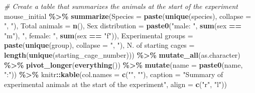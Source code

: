 \documentclass[
]{book}
\newenvironment{Shaded}{\begin{snugshade}}{\end{snugshade}}
\newcommand{\AttributeTok}[1]{\textcolor[rgb]{0.13,0.29,0.53}{#1}}
\newcommand{\CommentTok}[1]{\textcolor[rgb]{0.56,0.35,0.01}{\textit{#1}}}
\newcommand{\FunctionTok}[1]{\textcolor[rgb]{0.13,0.29,0.53}{\textbf{#1}}}
\newcommand{\NormalTok}[1]{#1}
\newcommand{\OtherTok}[1]{\textcolor[rgb]{0.56,0.35,0.01}{#1}}
\newcommand{\SpecialCharTok}[1]{\textcolor[rgb]{0.81,0.36,0.00}{\textbf{#1}}}
\newcommand{\StringTok}[1]{\textcolor[rgb]{0.31,0.60,0.02}{#1}}
\begin{document}
\begin{Shaded}
\begin{Highlighting}[]
\CommentTok{\# Create a table that summarizes the animals at the start of the experiment}
\NormalTok{mouse\_initial }\SpecialCharTok{\%\textgreater{}\%} 
  \FunctionTok{summarize}\NormalTok{(}\AttributeTok{Species =} \FunctionTok{paste}\NormalTok{(}\FunctionTok{unique}\NormalTok{(species), }\AttributeTok{collapse =} \StringTok{", "}\NormalTok{), }
            \StringTok{\textasciigrave{}}\AttributeTok{Total animals}\StringTok{\textasciigrave{}} \OtherTok{=} \FunctionTok{n}\NormalTok{(), }
            \StringTok{\textasciigrave{}}\AttributeTok{Sex distribution}\StringTok{\textasciigrave{}} \OtherTok{=} \FunctionTok{paste0}\NormalTok{(}\StringTok{"male: "}\NormalTok{, }\FunctionTok{sum}\NormalTok{(sex }\SpecialCharTok{==} \StringTok{"m"}\NormalTok{), }
                                      \StringTok{", female: "}\NormalTok{, }\FunctionTok{sum}\NormalTok{(sex }\SpecialCharTok{==} \StringTok{"f"}\NormalTok{)),}
            \StringTok{\textasciigrave{}}\AttributeTok{Experimental groups}\StringTok{\textasciigrave{}} \OtherTok{=} \FunctionTok{paste}\NormalTok{(}\FunctionTok{unique}\NormalTok{(group), }\AttributeTok{collapse =} \StringTok{", "}\NormalTok{),}
            \StringTok{\textasciigrave{}}\AttributeTok{N. of starting cages}\StringTok{\textasciigrave{}} \OtherTok{=}
              \FunctionTok{length}\NormalTok{(}\FunctionTok{unique}\NormalTok{(starting\_cage\_number))) }\SpecialCharTok{\%\textgreater{}\%} 
  \FunctionTok{mutate\_all}\NormalTok{(as.character) }\SpecialCharTok{\%\textgreater{}\%} 
  \FunctionTok{pivot\_longer}\NormalTok{(}\FunctionTok{everything}\NormalTok{()) }\SpecialCharTok{\%\textgreater{}\%} 
  \FunctionTok{mutate}\NormalTok{(}\AttributeTok{name =} \FunctionTok{paste0}\NormalTok{(name, }\StringTok{":"}\NormalTok{)) }\SpecialCharTok{\%\textgreater{}\%} 
\NormalTok{  knitr}\SpecialCharTok{::}\FunctionTok{kable}\NormalTok{(}\AttributeTok{col.names =} \FunctionTok{c}\NormalTok{(}\StringTok{""}\NormalTok{, }\StringTok{""}\NormalTok{), }
               \AttributeTok{caption =} \StringTok{"Summary of experimental animals at the start of the experiment"}\NormalTok{, }
               \AttributeTok{align =} \FunctionTok{c}\NormalTok{(}\StringTok{"r"}\NormalTok{, }\StringTok{"l"}\NormalTok{))}
\end{Highlighting}
\end{Shaded}
\end{document}
